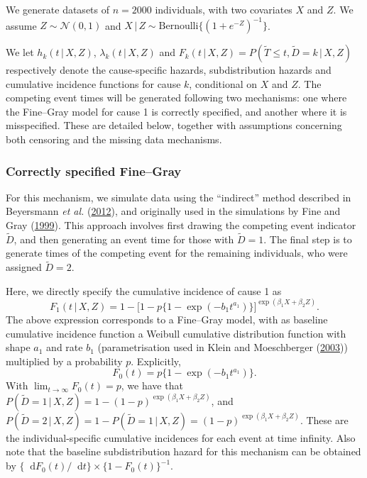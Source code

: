 \documentclass[
  letterpaper,
  DIV=11,
  numbers=noendperiod]{scrreprt}
\newcommand{\given}{\,|\,}
\newcommand\diff{\mathop{}\!\mathrm{d}}
\begin{document}
We generate datasets of \(n = 2000\) individuals, with two covariates
\(X\) and \(Z\). We assume \(Z \sim \mathcal{N}(0,1)\) and
\(X \given Z \sim \text{Bernoulli}\{(1 + e^{-Z})^{-1}\}\).

We let \(h_k(t \given X, Z)\), \(\lambda_k(t \given X, Z)\) and
\(F_k(t \given X, Z) = P(\tilde{T} \leq t, \tilde{D} = k \given X, Z)\)
respectively denote the cause-specific hazards, subdistribution hazards
and cumulative incidence functions for cause \(k\), conditional on \(X\)
and \(Z\). The competing event times will be generated following two
mechanisms: one where the Fine--Gray model for cause 1 is correctly
specified, and another where it is misspecified. These are detailed
below, together with assumptions concerning both censoring and the
missing data mechanisms.

\hypertarget{sec-corr-spec-FG}{%
\subsubsection{Correctly specified Fine--Gray}\label{sec-corr-spec-FG}}

For this mechanism, we simulate data using the ``indirect'' method
described in Beyersmann \emph{et al.}
(\protect\hyperlink{ref-beyersmannCompetingRisksMultistate2012}{2012}),
and originally used in the simulations by Fine and Gray
(\protect\hyperlink{ref-fineProportionalHazardsModel1999}{1999}). This
approach involves first drawing the competing event indicator
\(\tilde{D}\), and then generating an event time for those with
\(\tilde{D} = 1\). The final step is to generate times of the competing
event for the remaining individuals, who were assigned
\(\tilde{D} = 2\).

Here, we directly specify the cumulative incidence of cause 1 as
\begin{equation*}
    F_1(t \given X, Z) = 1 - \big[1 - p\{1- \exp(-b_1t^{a_1})\}\big]^{\exp(\beta_{1}X + \beta_{2}Z)}.
\end{equation*} The above expression corresponds to a Fine--Gray model,
with as baseline cumulative incidence function a Weibull cumulative
distribution function with shape \(a_1\) and rate \(b_1\)
(parametrisation used in Klein and Moeschberger
(\protect\hyperlink{ref-kleinSurvivalAnalysisTechniques2006}{2003}))
multiplied by a probability \(p\). Explicitly, \begin{equation*}
    F_0(t) = p\{1- \exp(-b_1t^{a_1})\}.
\end{equation*} With \(\lim_{t \to \infty}F_0(t) = p\), we have that
\(P(\tilde{D} = 1 \given X,Z) = 1 - (1-p)^{\exp(\beta_{1}X + \beta_{2}Z)}\),
and
\(P(\tilde{D} = 2 \given X, Z) = 1 - P(\tilde{D} = 1 \given X, Z) = (1-p)^{\exp(\beta_{1}X + \beta_{2}Z)}\).
These are the individual-specific cumulative incidences for each event
at time infinity. Also note that the baseline subdistribution hazard for
this mechanism can be obtained by
\(\{\diff F_0(t) / \diff t\} \times \{1 - F_0(t)\}^{-1}\).
\end{document}
